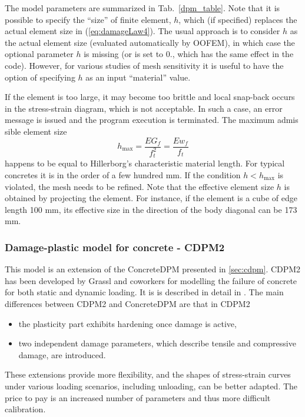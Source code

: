 \documentclass[a4paper]{article}
\begin{document}
The model parameters are summarized
in Tab.~\ref{dpm_table}. Note that it is possible to specify the ``size'' of finite element, $h$, which (if specified) replaces
the actual element size in  (\ref{eq:damageLaw4}). The usual approach is to consider $h$ as the actual element size (evaluated automatically by OOFEM), 
in which case the optional
parameter $h$ is missing (or is set to 0., which has the same effect in the code). However, for various studies of mesh sensitivity
it is useful to have the option of  specifying $h$ as an input ``material'' value.

If the element is too large, it may become too brittle and local snap-back
occurs in the stress-strain diagram, which is not acceptable. 
In such a case, an error message is issued and the program execution
is terminated. The maximum admis
sible element size 
\begin{equation}
h_{\max} = \frac{EG_f}{f_t^2} = \frac{Ew_f}{f_t}
\end{equation}
happens to be equal to Hillerborg's characteristic material length. 
For typical concretes it is in the order of a few hundred mm. 
If the condition $h<h_{\max}$ is violated, the mesh needs to be refined.
Note that the effective element size $h$ is obtained by projecting the element.
For instance, if the element is a cube of edge length 100 mm, its effective
size in the direction of the body diagonal can be 173 mm. 

\subsubsection{Damage-plastic model for concrete - CDPM2} \label{sec:cdpm2}

This model is an extension of the ConcreteDPM presented in \ref{sec:cdpm}.
CDPM2 has been developed by Grassl and coworkers for modelling the failure of concrete for both static and dynamic loading. It is is described in detail in \cite{GraXenNys13}.
The main differences between CDPM2 and ConcreteDPM are that in CDPM2
\begin{itemize}
\item the plasticity part exhibits hardening once damage is active,
\item two independent damage parameters, which describe tensile and compressive damage, are introduced.
\end{itemize}
These extensions provide more flexibility, and the shapes
of stress-strain curves under various loading scenarios, including unloading, can be better adapted. The price to pay
is an increased number of parameters and thus more difficult calibration.
\end{document}
